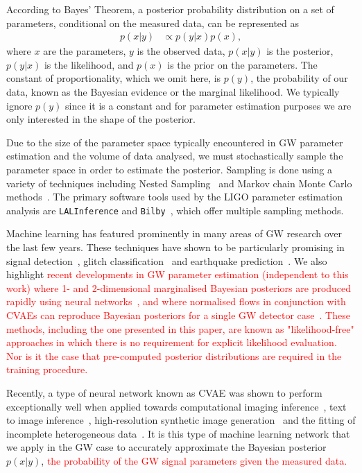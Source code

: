 \documentclass[%
showpacs,
nofootinbib,
 amsmath,amssymb,
 aps,
 twocolumn,
 prl,
 reprint,
floatfix,
]{revtex4-1}
\newcommand{\new}[1]{\textcolor{red}{#1}}
\begin{document}
%
%
According to Bayes' Theorem, a posterior probability distribution on a set of
parameters, conditional on the measured data, can be represented as
%
\begin{align}\label{eq:bayes_theorem} 
p(x|y) &\propto p(y|x) p(x), 
\end{align}
%
where $x$ are the parameters, $y$ is the observed data, $p(x|y)$ is the
posterior, $p(y|x)$ is the likelihood, and $p(x)$ is the prior on the
parameters. The constant of proportionality, which we omit here, is
$p(y)$, the probability of our data, known as the Bayesian evidence or the
marginal likelihood. We typically ignore $p(y)$ since it is a constant and for
parameter estimation purposes we are only interested in the shape of the
posterior.

%
%
Due to the size of the parameter space typically encountered in \ac{GW}
parameter estimation and the volume of data analysed, we must stochastically
sample the parameter space in order to estimate the posterior.  Sampling is
done using a variety of techniques including Nested
Sampling~\cite{skilling2006,cpnest,dynesty} and Markov chain Monte Carlo
methods~\cite{emcee,ptemcee}. The primary software tools used by the \ac{LIGO}
parameter estimation analysis are \texttt{LALInference} and
\texttt{Bilby}~\cite{1409.7215,1811.02042}, which offer multiple sampling
methods.  
  
%
%
Machine learning has featured prominently in many areas of \ac{GW} research
over the last few years. These techniques have shown to be particularly
promising in signal
detection~\cite{GEORGE201864,PhysRevLett.120.141103,GebKilParHarSch}, glitch
classification~\cite{0264-9381-34-6-064003} and earthquake
prediction~\cite{Coughlin_2017}. We also highlight \new{recent developments in
\ac{GW} parameter estimation (independent to this work) where 1- and
2-dimensional marginalised Bayesian posteriors are produced rapidly using
neural networks~\cite{2019arXiv190905966C}, and where normalised flows in
conjunction with \acp{CVAE} can reproduce Bayesian posteriors for a single
\ac{GW} detector case~\cite{2020arXiv200207656G}. These methods, including the
one presented in this paper, are known as "likelihood-free" approaches in which
there is no requirement for explicit likelihood evaluation. Nor is it the case
that pre-computed posterior distributions are required in the training
procedure.}

%
%
Recently, a type of neural network known as \ac{CVAE} was shown to perform
exceptionally well when applied towards computational imaging
inference~\cite{1904.06264,NIPS2015_5775}, text to image
inference~\cite{1512.00570}, high-resolution synthetic image
generation~\cite{1612.00005} and the fitting of incomplete heterogeneous
data~\cite{1807.03653}. It is this type of machine learning network that we
apply in the \ac{GW} case to accurately approximate the Bayesian posterior
$p(x|y)$, \new{the probability of the \ac{GW} signal parameters given the
measured data.} 
\end{document}
